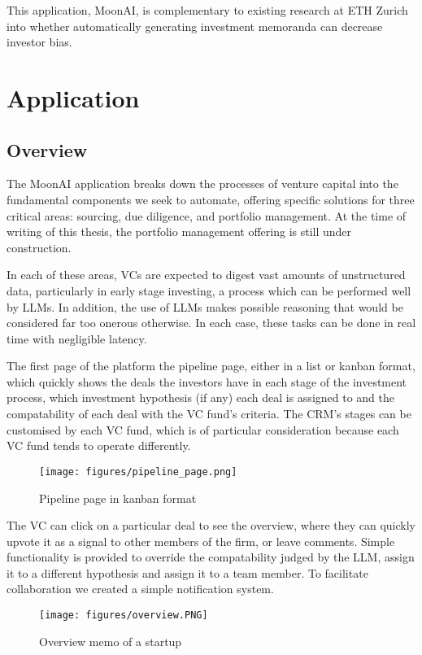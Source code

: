\documentclass[a4paper, oneside]{discothesis}
\begin{document}
This application, MoonAI, is complementary to existing research at ETH Zurich into whether automatically generating investment memoranda can decrease investor bias. 

\section{Application}
\subsection{Overview}

The MoonAI application breaks down the processes of venture capital into the fundamental components we seek to automate, offering specific solutions for three critical areas: sourcing, due diligence, and portfolio management. At the time of writing of this thesis, the portfolio management offering is still under construction.

In each of these areas, VCs are expected to digest vast amounts of unstructured data, particularly in early stage investing, a process which can be performed well by LLMs. In addition, the use of LLMs makes possible reasoning that would be considered far too onerous otherwise. In each case, these tasks can be done in real time with negligible latency.

The first page of the platform the pipeline page, either in a list or kanban format, which quickly shows the deals the investors have in each stage of the investment process, which investment hypothesis (if any) each deal is assigned to and the compatability of each deal with the VC fund's criteria. The CRM's stages can be customised by each VC fund, which is of particular consideration because each VC fund tends to operate differently.
\begin{figure}[h]
    \centering
    \texttt{[image: figures/pipeline\_page.png]}
    \caption{Pipeline page in kanban format}
    \label{fig:pipeline_page}
\end{figure}

The VC can click on a particular deal to see the overview, where they can quickly upvote it as a signal to other members of the firm, or leave comments. Simple functionality is provided to override the compatability judged by the LLM, assign it to a different hypothesis and assign it to a team member. To facilitate collaboration we created a simple notification system. 

\begin{figure}[h]
    \centering
    \texttt{[image: figures/overview.PNG]}
    \caption{Overview memo of a startup}
    \label{fig:overview_memo}
\end{figure}
\end{document}
